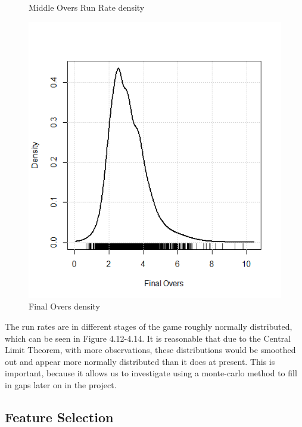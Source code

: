 \begin{figure}
      \caption{Middle Overs Run Rate density}
    \endminipage\hfill
      \includegraphics[width=\linewidth]{figures/finaloversdens.png}
      \caption{Final Overs density}
    \endminipage
    \label{rrDensitiesPlot}
\end{figure}

The run rates are  in different stages of the game roughly normally distributed, which can be seen in Figure 4.12-4.14. It is reasonable that due to the Central Limit Theorem, with more observations, these distributions would be smoothed out and 
appear more normally distributed than it does at present. This is important, because it allows us to investigate using a monte-carlo method to fill in gaps 
later on in the project.

\subsection{Feature Selection}
\label{lassoSec}

